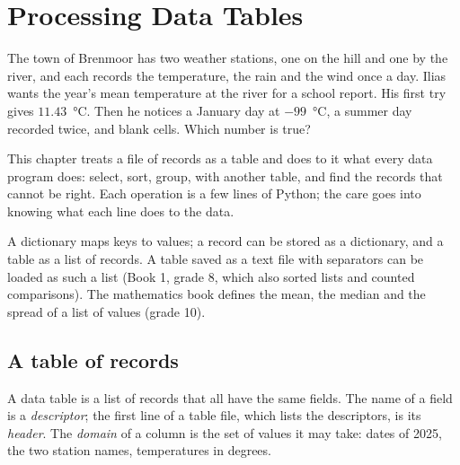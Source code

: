 \chapter{Processing Data Tables}\label{ch:g10:data-tables}

The town of Brenmoor has two weather stations, one on the hill and one by the river, and each records the
temperature, the rain and the wind once a day. Ilias wants the year's mean temperature at the river for a school
report. His first try gives $11.43$~°C. Then he notices a January day at $-99$~°C, a summer day recorded twice, and
blank cells. Which number is true?

This chapter treats a file of records as a table and does to it what every data program does: select, sort, group,
 with another table, and find the records that cannot be right. Each operation is a few lines of Python; the
care goes into knowing what each line does to the data.

\begin{recall}
A dictionary maps keys to values; a record can be stored as a dictionary, and a table as a list of records. A table
saved as a text file with separators can be loaded as such a list (Book 1, grade 8, which also sorted lists and
counted comparisons). The mathematics book defines the mean, the median and the spread of a list of values
(grade 10).
\end{recall}

\section{A table of records}\label{sec:g10:data-tables:records}

\begin{definition}\label{def:g10:data-tables:header}
A data table is a list of records that all have the same fields. The name of a field is a
\emph{descriptor}; the first line of a table file, which lists the descriptors, is its
\emph{header}. The \emph{domain} of a column is the set of values
it may take: dates of 2025, the two station names, temperatures in degrees.
\end{definition}

